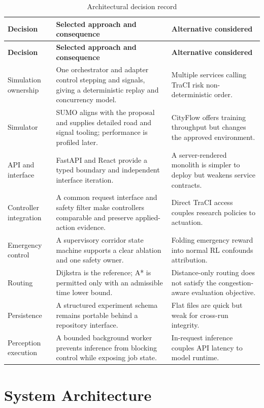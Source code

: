 \begin{longtable}{P{0.20\textwidth}P{0.34\textwidth}P{0.35\textwidth}}
\caption{Architectural decision record}\label{tab:decisions}\\
\toprule
\textbf{Decision} & \textbf{Selected approach and consequence} & \textbf{Alternative considered}\\
\midrule\endfirsthead
\toprule
\textbf{Decision} & \textbf{Selected approach and consequence} & \textbf{Alternative considered}\\
\midrule\endhead
Simulation ownership & One orchestrator and adapter control stepping and signals, giving a deterministic replay and concurrency model. & Multiple services calling TraCI risk non-deterministic order.\\
Simulator & SUMO aligns with the proposal and supplies detailed road and signal tooling; performance is profiled later. & CityFlow offers training throughput but changes the approved environment.\\
API and interface & FastAPI and React provide a typed boundary and independent interface iteration. & A server-rendered monolith is simpler to deploy but weakens service contracts.\\
Controller integration & A common request interface and safety filter make controllers comparable and preserve applied-action evidence. & Direct TraCI access couples research policies to actuation.\\
Emergency control & A supervisory corridor state machine supports a clear ablation and one safety owner. & Folding emergency reward into normal RL confounds attribution.\\
Routing & Dijkstra is the reference; A* is permitted only with an admissible time lower bound. & Distance-only routing does not satisfy the congestion-aware evaluation objective.\\
Persistence & A structured experiment schema remains portable behind a repository interface. & Flat files are quick but weak for cross-run integrity.\\
Perception execution & A bounded background worker prevents inference from blocking control while exposing job state. & In-request inference couples API latency to model runtime.\\
\bottomrule
\end{longtable}

\section{System Architecture}

